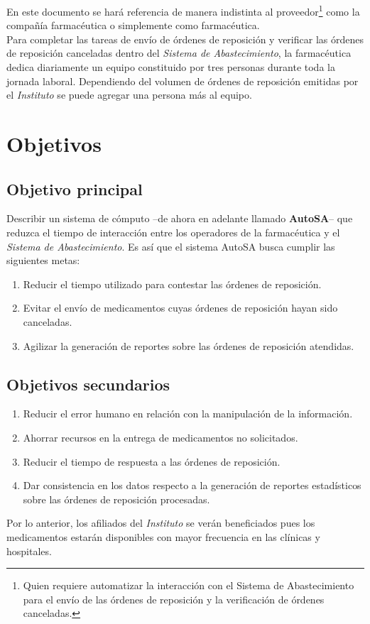 En este documento se hará referencia de manera indistinta al proveedor\footnote{Quien requiere automatizar la interacción con el Sistema de Abastecimiento para el envío de las órdenes de reposición y la verificación de órdenes canceladas.} como la compañía farmacéutica o simplemente como farmacéutica.\\
Para completar las tareas de envío de órdenes de reposición y verificar las órdenes de reposición canceladas dentro del \textit{Sistema de Abastecimiento}, la farmacéutica dedica diariamente un equipo constituido por tres personas durante toda la jornada laboral. Dependiendo del volumen de órdenes de reposición emitidas por el \textit{Instituto} se puede agregar una persona más al equipo.

\section{Objetivos}
\subsection{Objetivo principal}\label{sec:objetivo-principal}
Describir un sistema de cómputo --de ahora en adelante llamado \textbf{AutoSA}-- que reduzca el tiempo de interacción entre los operadores de la farmacéutica y el \textit{Sistema de Abastecimiento}. Es así que el sistema AutoSA busca cumplir las siguientes metas:
\begin{enumerate}
	\item Reducir el tiempo utilizado para contestar las órdenes de reposición.
	\item Evitar el envío de medicamentos cuyas órdenes de reposición hayan sido canceladas.
	\item Agilizar la generación de reportes sobre las órdenes de reposición atendidas.
\end{enumerate}

\subsection{Objetivos secundarios}\label{sec:objetivos-secundarios}
\begin{enumerate}
\item Reducir el error humano en relación con la manipulación de la información.
\item Ahorrar recursos en la entrega de medicamentos no solicitados.
\item Reducir el tiempo de respuesta a las órdenes de reposición.
\item Dar consistencia en los datos respecto a la generación de reportes estadísticos sobre las órdenes de reposición procesadas.
\end{enumerate}
Por lo anterior, los afiliados del \textit{Instituto} se verán beneficiados pues los medicamentos estarán disponibles con mayor frecuencia en las clínicas y hospitales.

